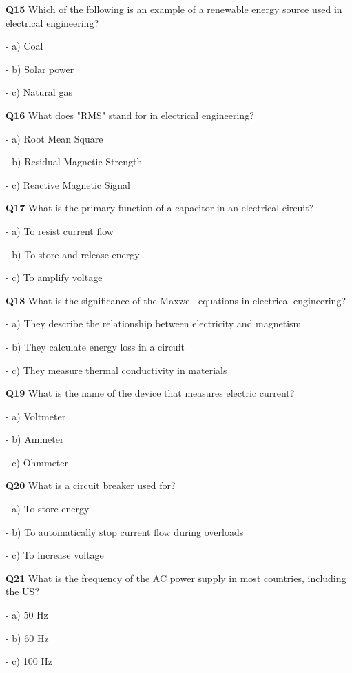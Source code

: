 \textbf{Q15} Which of the following is an example of a renewable energy source used in electrical engineering?\par
\quad - a) Coal\par
\quad - b) Solar power\par
\quad - c) Natural gas\par

\textbf{Q16} What does "RMS" stand for in electrical engineering?\par
\quad - a) Root Mean Square\par
\quad - b) Residual Magnetic Strength\par
\quad - c) Reactive Magnetic Signal\par

\textbf{Q17} What is the primary function of a capacitor in an electrical circuit?\par
\quad - a) To resist current flow\par
\quad - b) To store and release energy\par
\quad - c) To amplify voltage\par

\textbf{Q18} What is the significance of the Maxwell equations in electrical engineering?\par
\quad - a) They describe the relationship between electricity and magnetism\par
\quad - b) They calculate energy loss in a circuit\par
\quad - c) They measure thermal conductivity in materials\par

\textbf{Q19} What is the name of the device that measures electric current?\par
\quad - a) Voltmeter\par
\quad - b) Ammeter\par
\quad - c) Ohmmeter\par

\textbf{Q20} What is a circuit breaker used for?\par
\quad - a) To store energy\par
\quad - b) To automatically stop current flow during overloads\par
\quad - c) To increase voltage\par

\textbf{Q21} What is the frequency of the AC power supply in most countries, including the US?\par
\quad - a) 50 Hz\par
\quad - b) 60 Hz\par
\quad - c) 100 Hz\par

